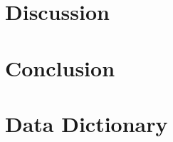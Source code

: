 \documentclass[]{article}
\begin{document}
\section{Discussion}


\section{Conclusion}

%
%
%
% 
% 
%
%



\appendix

\section{Data Dictionary}
\label{appendix:data_dict}

\end{document}
